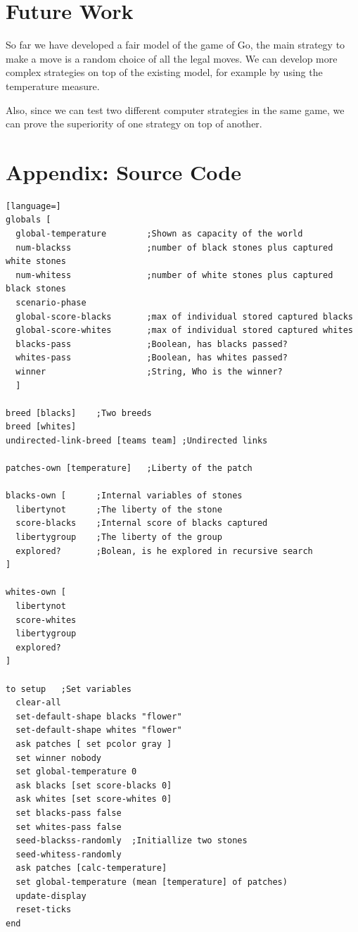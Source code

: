 \documentclass[a4paper,10pt,twocolumn]{article}
\begin{document}
\begin{CJK*}{UTF8}{gbsn}
\section{Future Work}

So far we have developed a fair model of the game of Go, the main strategy to make a move is a random choice of all the legal moves. We can develop more complex strategies on top of the existing model, for example by using the temperature measure. 

Also, since we can test two different computer strategies in the same game, we can prove the superiority of one strategy on top of another. 


\newpage
\onecolumn
\appendix

\section{Appendix: Source Code}
\begin{lstlisting}[language=]
globals [
  global-temperature        ;Shown as capacity of the world
  num-blackss               ;number of black stones plus captured white stones
  num-whitess               ;number of white stones plus captured black stones
  scenario-phase            
  global-score-blacks       ;max of individual stored captured blacks
  global-score-whites       ;max of individual stored captured whites
  blacks-pass               ;Boolean, has blacks passed?
  whites-pass               ;Boolean, has whites passed?
  winner                    ;String, Who is the winner?
  ]

breed [blacks]    ;Two breeds
breed [whites]
undirected-link-breed [teams team] ;Undirected links

patches-own [temperature]   ;Liberty of the patch

blacks-own [      ;Internal variables of stones
  libertynot      ;The liberty of the stone
  score-blacks    ;Internal score of blacks captured
  libertygroup    ;The liberty of the group
  explored?       ;Bolean, is he explored in recursive search
]

whites-own [
  libertynot 
  score-whites
  libertygroup
  explored?
]

to setup   ;Set variables
  clear-all
  set-default-shape blacks "flower"
  set-default-shape whites "flower"
  ask patches [ set pcolor gray ]
  set winner nobody
  set global-temperature 0
  ask blacks [set score-blacks 0]
  ask whites [set score-whites 0]
  set blacks-pass false
  set whites-pass false
  seed-blackss-randomly  ;Initiallize two stones 
  seed-whitess-randomly
  ask patches [calc-temperature]
  set global-temperature (mean [temperature] of patches)
  update-display
  reset-ticks
end


\end{lstlisting}
\end{CJK*}
\end{document}
